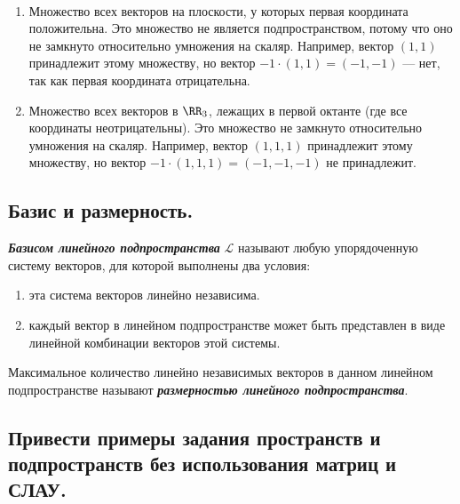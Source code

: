\begin{counterexample}~

    \begin{enumerate}
        \item Множество всех векторов на плоскости, у которых первая координата положительна. Это множество не является подпространством, потому что оно не замкнуто относительно умножения на скаляр. Например, вектор $(1, 1)$ принадлежит этому множеству, но вектор $-1 \cdot (1, 1) = (-1, -1)$ — нет, так как первая координата отрицательна.
        \item Множество всех векторов в $\RR_3$, лежащих в первой октанте (где все координаты неотрицательны). Это множество не замкнуто относительно умножения на скаляр. Например, вектор $(1, 1, 1)$ принадлежит этому множеству, но вектор $-1 \cdot (1, 1, 1) = (-1, -1, -1)$ не принадлежит.
    \end{enumerate}
\end{counterexample}


\newpage


\subsection{
    Базис и размерность.
}

\begin{definition}
    \textbf{\textit{Базисом линейного подпространства}} $\mathcal{L}$ называют любую упорядоченную систему векторов, для которой выполнены два условия:
    \begin{enumerate}[nosep]
        \item эта система векторов линейно независима.
        \item каждый вектор в линейном подпространстве может быть представлен в виде линейной комбинации векторов этой системы.
    \end{enumerate}
\end{definition}

\begin{definition}
    Максимальное количество линейно независимых векторов в данном линейном подпространстве называют \textbf{\textit{размерностью линейного подпространства}}.
\end{definition}


\newpage


\subsection{
    Привести примеры задания пространств и подпространств без использования матриц и СЛАУ.
}

